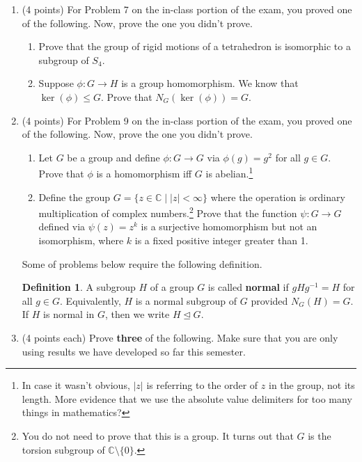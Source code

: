 \documentclass[11pt]{scrartcl}
\theoremstyle{definition}
\newtheorem*{definition*}{Definition}
\begin{document}
\begin{enumerate}

\item (4 points) For Problem 7 on the in-class portion of the exam, you proved one of the following.  Now, prove the one you didn't prove.
\begin{enumerate}[label=\text{(\alph*)}]
\item Prove that the group of rigid motions of a tetrahedron is isomorphic to a subgroup of $S_4$.
\item Suppose $\phi:G\to H$ is a group homomorphism.  We know that $\ker(\phi)\leq G$.  Prove that $N_G(\ker(\phi))=G$.
\end{enumerate}

\item (4 points) For Problem 9 on the in-class portion of the exam, you proved one of the following.  Now, prove the one you didn't prove.
\begin{enumerate}[label=\text{(\alph*)}]
\item Let $G$ be a group and define $\phi:G\to G$ via $\phi(g)=g^2$ for all $g\in G$.  Prove that $\phi$ is a homomorphism iff $G$ is abelian.\footnote{In case it wasn't obvious, $|z|$ is referring to the order of $z$ in the group, not its length.  More evidence that we use the absolute value delimiters for too many things in mathematics?}
\item Define the group $G=\{z\in\mathbb{C}\mid |z|<\infty\}$ where the operation is ordinary multiplication of complex numbers.\footnote{You do not need to prove that this is a group.  It turns out that $G$ is the torsion subgroup of $\mathbb{C}\setminus\{0\}$.} Prove that the function $\psi:G\to G$ defined via $\psi(z)=z^k$ is a surjective homomorphism but not an isomorphism, where $k$ is a fixed positive integer greater than 1.
\end{enumerate}

Some of problems below require the following definition.

\bigskip

\begin{definition*}
A subgroup $H$ of a group $G$ is called \textbf{normal} if $gHg^{-1}=H$ for all $g\in G$.  Equivalently, $H$ is a normal subgroup of $G$ provided $N_G(H)=G$.  If $H$ is normal in $G$, then we write $H\unlhd G$.
\end{definition*}

\item (4 points each) Prove \textbf{three} of the following. Make sure that you are only using results we have developed so far this semester.


\end{enumerate}
\end{document}
